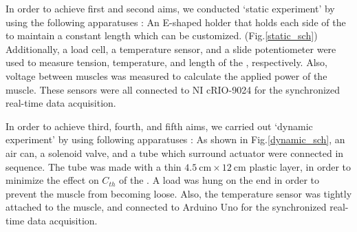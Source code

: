 In order to achieve first and second aims, we conducted `static experiment' by using the following apparatuses : An E-shaped holder that holds each side of the \scp to maintain a constant length which can be customized. (Fig.\ref{static_sch}) Additionally, a load cell, a temperature sensor, and a slide potentiometer were used to measure tension, temperature, and length of the \scpnospace, respectively. Also, voltage between muscles was measured to calculate the applied power of the muscle. These sensors were all connected to NI cRIO-9024 for the synchronized real-time data acquisition.

In order to achieve third, fourth, and fifth aims, we carried out `dynamic experiment' by using following apparatuses : As shown in Fig.\ref{dynamic_sch}, an air can, a solenoid valve, and a tube which surround actuator were connected in sequence. 
The tube was made with a thin $\SI{4.5}{\centi\meter} \times \SI{12}{\centi\meter}$ plastic layer, in order to minimize the effect on $C_{th}$ of the \scpnospace.
A load was hung on the end in order to prevent the muscle from becoming loose. 
Also, the temperature sensor was tightly attached to the muscle, and connected to Arduino Uno for the synchronized real-time data acquisition.



